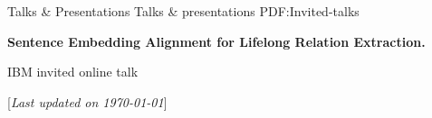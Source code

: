 \documentclass[letterpaper,MMMyyyy,nonstopmode]{simpleresumecv}
\newcommand{\CVNote}{Last updated on {\today}}
\begin{document}
\begin{Body}
\Section
{Talks \& \newline Presentations}
{Talks \& presentations}
{PDF:Invited-talks}

\Entry \textbf{Sentence Embedding Alignment for Lifelong Relation Extraction.} \hfill {}
\begin{Detail}
\BulletItem
IBM invited online talk
\end{Detail}


\end{Body}


\UseNoteFont%
\null\hfill%
[\textit{\CVNote}]
\end{document}
